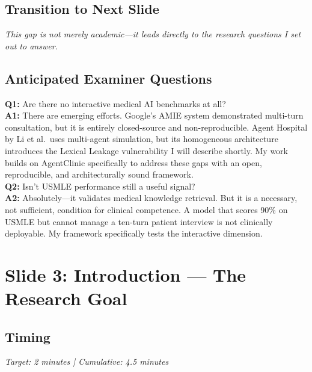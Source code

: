 \documentclass[12pt]{article}
\begin{document}
  \subsection*{Transition to Next Slide}
  {\color{transgreen}
  \textit{This gap is not merely academic---it leads directly to the research questions I set out to answer.}
  }

  \subsection*{Anticipated Examiner Questions}
  \begin{qabox}
  \textbf{Q1:} Are there no interactive medical AI benchmarks at all? \\
  \textbf{A1:} There are emerging efforts. Google's AMIE system demonstrated multi-turn consultation, but it is entirely closed-source and non-reproducible. Agent Hospital by Li et al.\ uses multi-agent simulation, but its homogeneous architecture introduces the Lexical Leakage vulnerability I will describe shortly. My work builds on AgentClinic specifically to address these gaps with an open, reproducible, and architecturally sound framework. \\[6pt]
  \textbf{Q2:} Isn't USMLE performance still a useful signal? \\
  \textbf{A2:} Absolutely---it validates medical knowledge retrieval. But it is a necessary, not sufficient, condition for clinical competence. A model that scores 90\% on USMLE but cannot manage a ten-turn patient interview is not clinically deployable. My framework specifically tests the interactive dimension.
  \end{qabox}



  \section{Slide 3: Introduction --- The Research Goal}

  \subsection*{Timing}
  \textit{Target: 2 minutes | Cumulative: 4.5 minutes}
\end{document}
